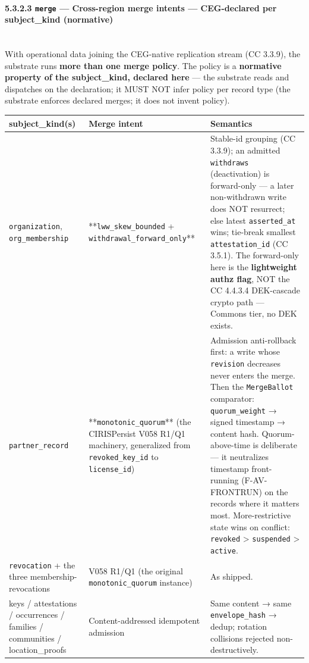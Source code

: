 \documentclass[11pt]{article}
\begin{document}
\paragraph{5.3.2.3 \texttt{merge} — Cross-region merge intents — CEG-declared per subject\_kind (normative)}\mbox{}\\


With operational data joining the CEG-native replication stream (CC 3.3.9), the substrate runs \textbf{more than one merge policy}. The policy is a \textbf{normative property of the subject\_kind, declared here} — the substrate reads and dispatches on the declaration; it MUST NOT infer policy per record type (the substrate enforces declared merges; it does not invent policy).


{\footnotesize
\begin{longtable}{|p{5.33cm}|p{5.33cm}|p{5.33cm}|}\hline
\textbf{subject\_kind(s)} & \textbf{Merge intent} & \textbf{Semantics} \\ \hline\endhead
\texttt{organization}, \texttt{org\_membership} & **\texttt{lww\_skew\_bounded} + \texttt{withdrawal\_forward\_only}** & Stable-id grouping (CC 3.3.9); an admitted \texttt{withdraws} (deactivation) is forward-only — a later non-withdrawn write does NOT resurrect; else latest \texttt{asserted\_at} wins; tie-break smallest \texttt{attestation\_id} (CC 3.5.1). The forward-only here is the \textbf{lightweight authz flag}, NOT the CC 4.4.3.4 DEK-cascade crypto path — Commons tier, no DEK exists. \\ \hline
\texttt{partner\_record} & **\texttt{monotonic\_quorum}** (the CIRISPersist V058 R1/Q1 machinery, generalized from \texttt{revoked\_key\_id} to \texttt{license\_id}) & Admission anti-rollback first: a write whose \texttt{revision} decreases never enters the merge. Then the \texttt{MergeBallot} comparator: \texttt{quorum\_weight} → signed timestamp → content hash. Quorum-above-time is deliberate — it neutralizes timestamp front-running (F-AV-FRONTRUN) on the records where it matters most. More-restrictive state wins on conflict: \texttt{revoked} > \texttt{suspended} > \texttt{active}. \\ \hline
\texttt{revocation} + the three membership-revocations & V058 R1/Q1 (the original \texttt{monotonic\_quorum} instance) & As shipped. \\ \hline
keys / attestations / occurrences / families / communities / location\_proofs & Content-addressed idempotent admission & Same content → same \texttt{envelope\_hash} → dedup; rotation collisions rejected non-destructively. \\ \hline
\end{longtable}}
\end{document}
